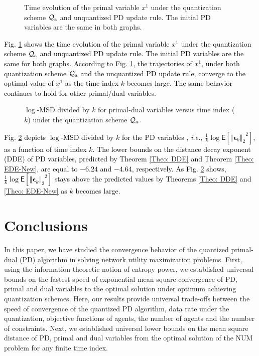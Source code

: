 \documentclass[10pt,twocolumn,twoside]{IEEEtran}
\begin{document}
\begin{figure}[t]
\centering
{}
\caption{\small Time evolution of the primal variable $x^1$ under the quantization scheme $\mathcal{Q}_{\rm a}$ and unquantized PD update rule. The initial PD variables are the same in both graphs.}
\label{F1-2}
\end{figure}
\textcolor{black}{Fig. \ref{F1-2} shows the time evolution of the primal variable $x^1$ under the quantization scheme $\mathcal{Q}_{\rm a}$ and unquantized PD update rule. The initial PD variables are the same for both graphs. According to Fig. \ref{F1-2}, the trajectories of $x^1$, under both quantization scheme $\mathcal{Q}_{\rm a}$ and the unquantized PD update rule, converge to the optimal value of ${x^1}$ as the time index $k$ becomes large. The same behavior continues to hold for other primal/dual variables. }

\begin{figure}[!t]
\caption{$\log$-MSD divided by $k$ for primal-dual variables versus time index ($k$) under the quantization scheme $\mathcal{Q}_{\rm a}$.} \label{F3}
\end{figure}
\textcolor{black}{Fig. \ref{F3} depicts $\log$-MSD divided by $k$ for the PD variables , \emph{i.e.,} $\frac{1}{k}\log{\ensuremath{\mathsf{E}\left[{{\left\Vert{{\ensuremath{\boldsymbol{{\epsilon}}}}_k}\right\Vert_{{2}}}^2} \right]}}$, as a function of time index $k$. The lower bounds on the distance decay exponent (DDE) of PD variables, predicted by Theorem \ref{Theo: DDE} and Theorem \ref{Theo: EDE-New},  are equal to $ -6.24$ and $-4.64$, respectively. As Fig. \ref{F3} shows, $\frac{1}{k}\log{\ensuremath{\mathsf{E}\left[{{\left\Vert{{\ensuremath{\boldsymbol{{\epsilon}}}}_k}\right\Vert_{{2}}}^2} \right]}}$ stays above the predicted values by Theorems \ref{Theo: DDE} and \ref{Theo: EDE-New} as $k$ becomes large.}

\section{Conclusions}\label{Sec: Conc}
In this paper, we have studied the convergence behavior of the  quantized primal-dual (PD) algorithm in solving network utility maximization problems. First, using the information-theoretic notion of entropy power, we established universal bounds on the fastest speed of exponential mean square convergence of PD, primal and dual variables to the optimal solution under optimum achieving quantization schemes. Here, our results provide universal trade-offs between the speed of convergence of the quantized PD algorithm, data rate under the quantization, objective functions of agents,  the number of agents and the number of constraints.   Next, we established universal lower bounds on the mean square distance of PD, primal and dual variables from the optimal solution of the NUM problem for any finite time index. 
\appendices
\end{document}
